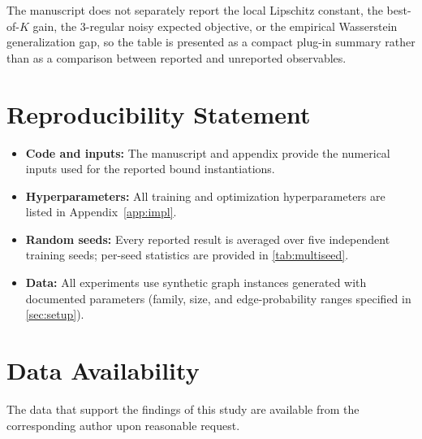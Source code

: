 \documentclass[aps,prx,reprint,superscriptaddress,longbibliography]{revtex4-2}
\begin{document}
The manuscript does not separately report the local Lipschitz constant,
the best-of-$K$ gain, the 3-regular noisy expected objective, or the
empirical Wasserstein generalization gap, so the table is presented as
a compact plug-in summary rather than as a comparison between reported
and unreported observables.

\section*{Reproducibility Statement}
\label{app:reproducibility}
\begin{itemize}[leftmargin=*,nosep]
\item \textbf{Code and inputs:} The manuscript and appendix provide the
    numerical inputs used for the reported bound instantiations.
\item \textbf{Hyperparameters:} All training and optimization
      hyperparameters are listed in Appendix~\ref{app:impl}.
\item \textbf{Random seeds:} Every reported result is averaged over
      five independent training seeds; per-seed statistics are
      provided in \cref{tab:multiseed}.
\item \textbf{Data:} All experiments use synthetic graph instances
      generated with documented parameters
      (family, size, and edge-probability ranges specified in
      \cref{sec:setup}).
\end{itemize}

\section*{Data Availability}

The data that support the findings of this study are available from
the corresponding author upon reasonable request.

\hypersetup{hidelinks}


\end{document}
